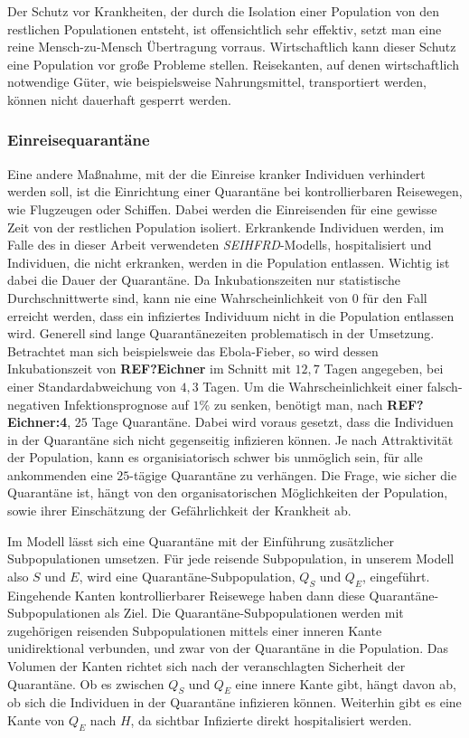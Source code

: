Der Schutz vor Krankheiten, der durch die Isolation einer Population von den restlichen Populationen entsteht, ist offensichtlich sehr effektiv, setzt man eine reine Mensch-zu-Mensch Übertragung vorraus. Wirtschaftlich kann dieser Schutz eine Population vor große Probleme stellen. Reisekanten, auf denen wirtschaftlich notwendige Güter, wie beispielsweise Nahrungsmittel, transportiert werden, können nicht dauerhaft gesperrt werden. 

\subsubsection{Einreisequarantäne}
Eine andere Maßnahme, mit der die Einreise kranker Individuen verhindert werden soll, ist die Einrichtung einer Quarantäne bei kontrollierbaren Reisewegen, wie Flugzeugen oder Schiffen. Dabei werden die Einreisenden für eine gewisse Zeit von der restlichen Population isoliert. Erkrankende Individuen werden, im Falle des in dieser Arbeit verwendeten \emph{SEIHFRD}-Modells, hospitalisiert und Individuen, die nicht erkranken, werden in die Population entlassen. Wichtig ist dabei die Dauer der Quarantäne. Da Inkubationszeiten nur statistische Durchschnittwerte sind, kann nie eine Wahrscheinlichkeit von 0 für den Fall erreicht werden, dass ein infiziertes Individuum nicht in die Population entlassen wird. Generell sind lange Quarantänezeiten problematisch in der Umsetzung. Betrachtet man sich beispielsweie das Ebola-Fieber, so wird dessen Inkubationszeit von \textbf{REF?Eichner} im Schnitt mit $12,7$ Tagen angegeben, bei einer Standardabweichung von $4,3$ Tagen. Um die Wahrscheinlichkeit einer falsch-negativen Infektionsprognose auf $1\%$ zu senken, benötigt man, nach \textbf{REF?Eichner:4}, $25$ Tage Quarantäne. Dabei wird voraus gesetzt, dass die Individuen in der Quarantäne sich nicht gegenseitig infizieren können. Je nach Attraktivität der Population, kann es organisiatorisch schwer bis unmöglich sein, für alle ankommenden eine $25$-tägige Quarantäne zu verhängen. Die Frage, wie sicher die Quarantäne ist, hängt von den organisatorischen Möglichkeiten der Population, sowie ihrer Einschätzung der Gefährlichkeit der Krankheit ab. 

Im Modell lässt sich eine Quarantäne mit der Einführung zusätzlicher Subpopulationen umsetzen. Für jede reisende Subpopulation, in unserem Modell also $S$ und $E$, wird eine Quarantäne-Subpopulation, $Q_S$ und $Q_E$, eingeführt. Eingehende Kanten kontrollierbarer Reisewege haben dann diese Quarantäne-Subpopulationen als Ziel. Die Quarantäne-Subpopulationen werden mit zugehörigen reisenden Subpopulationen mittels einer inneren Kante unidirektional verbunden, und zwar von der Quarantäne in die Population. Das Volumen der Kanten richtet sich nach der veranschlagten Sicherheit der Quarantäne. Ob es zwischen $Q_S$ und $Q_E$ eine innere Kante gibt, hängt davon ab, ob sich die Individuen in der Quarantäne infizieren können. Weiterhin gibt es eine Kante von $Q_E$ nach $H$, da sichtbar Infizierte direkt hospitalisiert werden. 

